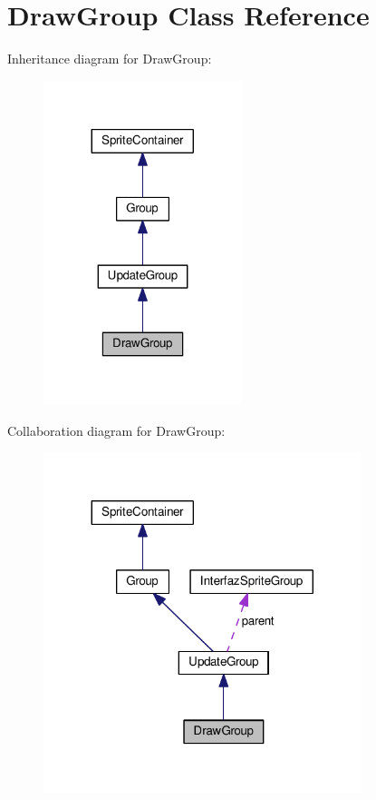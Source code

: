 \hypertarget{class_draw_group}{}\section{Draw\+Group Class Reference}
\label{class_draw_group}


Inheritance diagram for Draw\+Group\+:\nopagebreak
\begin{figure}[H]
\begin{center}
\leavevmode
\includegraphics[width=164pt]{class_draw_group__inherit__graph}
\end{center}
\end{figure}


Collaboration diagram for Draw\+Group\+:\nopagebreak
\begin{figure}[H]
\begin{center}
\leavevmode
\includegraphics[width=263pt]{class_draw_group__coll__graph}
\end{center}
\end{figure}
